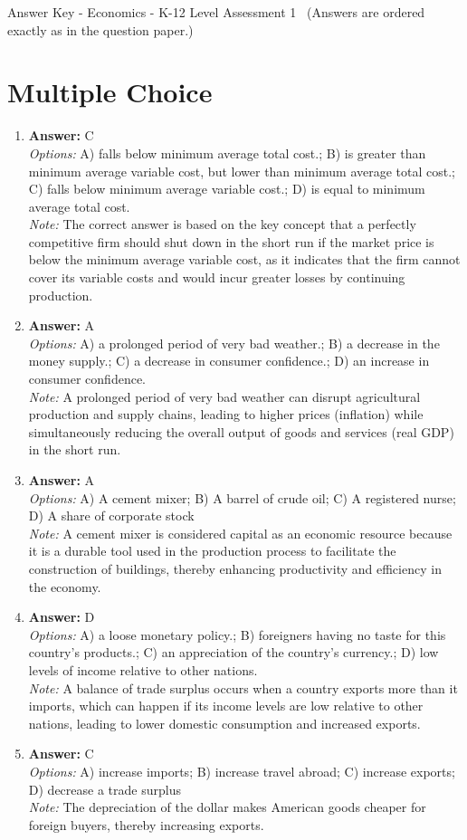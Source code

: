\documentclass[12pt]{article}
\begin{document}
\begin{center}
Answer Key - Economics - K-12 Level Assessment 1 \
\small (Answers are ordered exactly as in the question paper.)
\end{center}

\section*{Multiple Choice}
\begin{enumerate}[label=\arabic*.]
\item \textbf{Answer:} C
\\ \textit{Options:} A) falls below minimum average total cost.; B) is greater than minimum average variable cost, but lower than minimum average total cost.; C) falls below minimum average variable cost.; D) is equal to minimum average total cost.
\\ \textit{Note:} The correct answer is based on the key concept that a perfectly competitive firm should shut down in the short run if the market price is below the minimum average variable cost, as it indicates that the firm cannot cover its variable costs and would incur greater losses by continuing production.
\item \textbf{Answer:} A
\\ \textit{Options:} A) a prolonged period of very bad weather.; B) a decrease in the money supply.; C) a decrease in consumer confidence.; D) an increase in consumer confidence.
\\ \textit{Note:} A prolonged period of very bad weather can disrupt agricultural production and supply chains, leading to higher prices (inflation) while simultaneously reducing the overall output of goods and services (real GDP) in the short run.
\item \textbf{Answer:} A
\\ \textit{Options:} A) A cement mixer; B) A barrel of crude oil; C) A registered nurse; D) A share of corporate stock
\\ \textit{Note:} A cement mixer is considered capital as an economic resource because it is a durable tool used in the production process to facilitate the construction of buildings, thereby enhancing productivity and efficiency in the economy.
\item \textbf{Answer:} D
\\ \textit{Options:} A) a loose monetary policy.; B) foreigners having no taste for this country's products.; C) an appreciation of the country's currency.; D) low levels of income relative to other nations.
\\ \textit{Note:} A balance of trade surplus occurs when a country exports more than it imports, which can happen if its income levels are low relative to other nations, leading to lower domestic consumption and increased exports.
\item \textbf{Answer:} C
\\ \textit{Options:} A) increase imports; B) increase travel abroad; C) increase exports; D) decrease a trade surplus
\\ \textit{Note:} The depreciation of the dollar makes American goods cheaper for foreign buyers, thereby increasing exports.
\end{enumerate}
\end{document}

